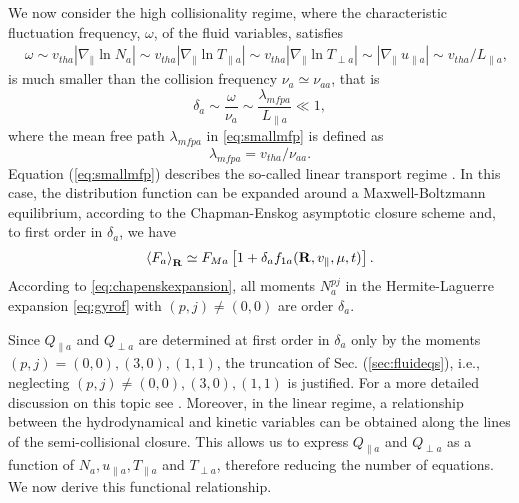 {{We now consider the high collisionality regime, where the characteristic fluctuation frequency{, $\omega$,} of the {fluid} variables, {satisfies}
%
\begin{equation}
\begin{split}
	&\omega \sim v_{tha} |\nabla_\parallel \ln N_a| \sim v_{tha} |\nabla_\parallel \ln T_{\parallel a}|\sim v_{tha} |\nabla_\parallel \ln T_{\perp a}| \sim |\nabla_\parallel \ u_{\parallel a}| \sim v_{th a}/ L_{\parallel a},
\end{split}
\end{equation}
%
is much smaller than the collision frequency $\nu_a \simeq \nu_{aa}$, that is
%
\begin{equation}
    \delta_a \sim \frac{\omega}{\nu_a} \sim \frac{\lambda_{mfp a}}{L_{\parallel a}} \ll 1,
\label{eq:smallmfp}
\end{equation}
%
where the mean free path $\lambda_{mfp a}$ in \cref{eq:smallmfp} is defined as
%
\begin{equation}
    \lambda_{mfp a} = v_{th a}/\nu_{aa}.
\end{equation}
%
Equation (\ref{eq:smallmfp}) describes the so-called linear transport regime \citep{Balescu1988}.
In this case, the distribution function can be expanded around a Maxwell-Boltzmann equilibrium, according to the Chapman-Enskog asymptotic closure scheme \citep{Chapman1962} and, to first order in $\delta_a$, we have
%
\begin{equation}
    \left< F_a \right>_{\mathbf R} \simeq F_{Ma}\left[1+\delta_a f_{1 a}(\mathbf R,v_{\parallel},\mu,t)\right].
\label{eq:chapenskexpansion}
\end{equation}
%
According to \cref{eq:chapenskexpansion}, all moments $N_a^{pj}$ in the Hermite-Laguerre expansion \cref{eq:gyrof} with $(p,j)\not=(0,0)$ are order $\delta_a$. {Since $Q_{\parallel a}$ and $Q_{\perp a}$ are determined at first order in $\delta_a$ only by the moments $(p,j)=(0,0),(3,0),(1,1)$, the truncation of Sec. (\ref{sec:fluideqs}), i.e., neglecting $(p,j)\not=(0,0),(3,0),(1,1)$ is justified. For a more detailed discussion {on this topic} see \citet{Balescu1988}.
Moreover, in the linear regime, a relationship between the hydrodynamical and kinetic variables can be obtained along the lines of the semi-collisional closure. This allows us to express $Q_{\parallel a}$ and $Q_{\perp a}$ as a function of $N_a, u_{\parallel a}, T_{\parallel a}$ and $T_{\perp a}$, therefore reducing the number of equations.
We now derive this functional relationship.

}}}

